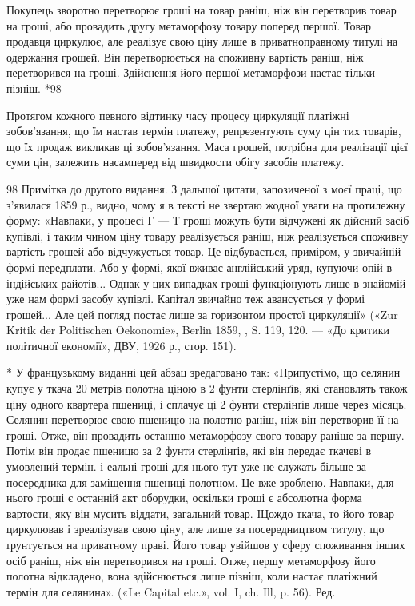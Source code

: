 Покупець зворотно перетворює гроші на товар раніш, ніж він перетворив товар на гроші, або провадить
другу метаморфозу товару поперед першої. Товар продавця циркулює, але реалізує свою ціну лише в
приватноправному титулі на одержання
грошей. Він перетворюється на споживну вартість раніш, ніж перетворився на гроші. Здійснення його
першої метаморфози настає тільки пізніш. *98

Протягом кожного певного відтинку часу процесу циркуляції платіжні зобов’язання, що їм настав термін
платежу, репрезентують суму цін тих товарів, що їх продаж викликав ці зобов’язання. Маса грошей,
потрібна для реалізації цієї суми цін,
залежить насамперед від швидкости обігу засобів платежу.

98 Примітка до другого видання. З дальшої цитати, запозиченої з моєї праці, що з’явилася 1859 р.,
видно, чому я в тексті не звертаю жодної уваги на протилежну форму: «Навпаки, у процесі Г — Т гроші
можуть бути відчужені як дійсний засіб купівлі, і таким чином ціну товару реалізується раніш, ніж
реалізується споживну вартість грошей або відчужується товар. Це відбувається, приміром, у звичайній
формі передплати. Або у формі, якої вживає англійський уряд, купуючи опій в індійських райотів...
Однак у цих випадках гроші функціонують лише в знайомій
уже нам формі засобу купівлі. Капітал звичайно теж авансується у формі грошей... Але цей погляд
постає лише за горизонтом простої циркуляції» («Zur Kritik der Politischen Oekonomie», Berlin 1859,
, S. 119, 120. — «До критики політичної економії», ДВУ, 1926 р., стор. 151).

*  У французькому виданні цей абзац зредаговано так: «Припустімо, що селянин купує у ткача 20 метрів
полотна ціною в 2 фунти стерлінґів, які становлять також ціну одного квартера пшениці, і сплачує ці
2 фунти стерлінґів лише через місяць. Селянин перетворює свою пшеницю на полотно раніш, ніж він
перетворив її на гроші. Отже, він провадить останню метаморфозу свого товару раніше за першу. Потім
він продає
пшеницю за 2 фунти стерлінґів, які він передає ткачеві в умовлений термін. і еальні гроші для нього
тут уже не служать більше за посередника для заміщення пшениці полотном. Це вже зроблено. Навпаки,
для нього гроші є останній акт оборудки, оскільки гроші є абсолютна форма вартости, яку він мусить
віддати, загальний товар. ІЦождо ткача, то його товар циркулював і зреалізував свою ціну, але лише
за посередництвом титулу, що ґрунтується на приватному праві. Його товар увійшов у сферу споживання
інших осіб раніш, ніж він перетворився на гроші. Отже, першу метаморфозу його полотна відкладено,
вона здійснюється лише пізніш, коли настає платіжний термін для селянина». («Le Capital etc.», vol.
I, ch. Ill, p. 56). Ред.
\parbreak{}  %
